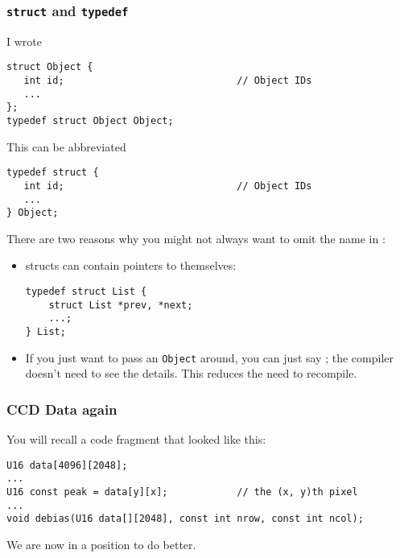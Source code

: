 \documentclass[10pt, t]{beamer}
\begin{document}
\begin{frame}[fragile]
\frametitle{\texttt{struct} and \texttt{typedef}}
\label{sec-5_1_18}

I wrote
\begin{verbatim}
struct Object {
   int id;                              // Object IDs
   ...
};
typedef struct Object Object;
\end{verbatim}
\pause
This can be abbreviated
\begin{verbatim}
typedef struct {
   int id;                              // Object IDs
   ...
} Object;
\end{verbatim}

\pause There are two reasons why you might not always want to omit the name in :

\begin{itemize}
\item structs can contain pointers to themselves:
\begin{verbatim}
typedef struct List {
    struct List *prev, *next;
    ...;
} List;
\end{verbatim}
\end{itemize}
\pause

\begin{itemize}
\item If you just want to pass an \texttt{Object} around, you can just say ; the compiler doesn't need to see the details.  \pause This reduces the need to recompile.
\end{itemize}
\end{frame}
\begin{frame}[fragile]
\frametitle{CCD Data again}
\label{sec-5_1_19}


You will recall a code fragment that looked like this:
\begin{verbatim}
U16 data[4096][2048];
...
U16 const peak = data[y][x];            // the (x, y)th pixel
...
void debias(U16 data[][2048], const int nrow, const int ncol);
\end{verbatim}

We are now in a position to do better.
\end{frame}
\end{document}
